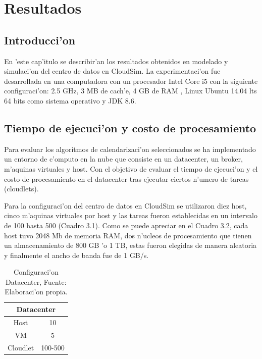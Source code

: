 \chapter{Resultados}
\section*{Introducci'on}

En 'este cap'itulo se describir'an los resultados obtenidos en modelado y simulaci'on del centro de datos en CloudSim. La experimentaci'on fue desarrollada en una computadora con  un procesador Intel Core i5  con la siguiente configuraci'on: 2.5 GHz, 3 MB de cach'e, 4 GB de RAM , Linux Ubuntu 14.04 lts 64 bits como sistema operativo y JDK 8.6.






\vspace{20em} 

\section{Tiempo de ejecuci'on y costo de procesamiento}


Para evaluar los algoritmos de calendarizaci'on seleccionados se ha implementado un entorno de c'omputo en la nube que consiste en un datacenter, un broker, m'aquinas virtuales y host.  Con el objetivo de evaluar el tiempo de ejecuci'on y el costo de procesamiento en el datacenter tras ejecutar ciertos n'umero de tareas (cloudlets).




Para la configuraci'on del centro de datos en CloudSim se utilizaron diez host, cinco m'aquinas virtuales por host y las tareas fueron establecidas en un intervalo de 100 hasta 500 (Cuadro 3.1).
Como se puede apreciar en el Cuadro 3.2, cada host tuvo 2048 Mb de memoria RAM, dos n'ucleos de procesamiento que tienen un almacenamiento de 800 GB 'o 1 TB, estas fueron elegidas de manera aleatoria y finalmente el ancho de banda fue de 1 GB/s.


\begin{table}[!hbt]
 
	\centering
	\caption{Configuraci'on Datacenter, Fuente: Elaboraci'on propia.}
	\begin{tabular}{@{}cc@{}}
		\toprule
		\multicolumn{2}{c}{{\bf Datacenter}} \\ \midrule
		Host              & 10               \\
		VM                & 5                \\
		Cloudlet          & 100-500          \\ \bottomrule
	\end{tabular}
\end{table}
 
